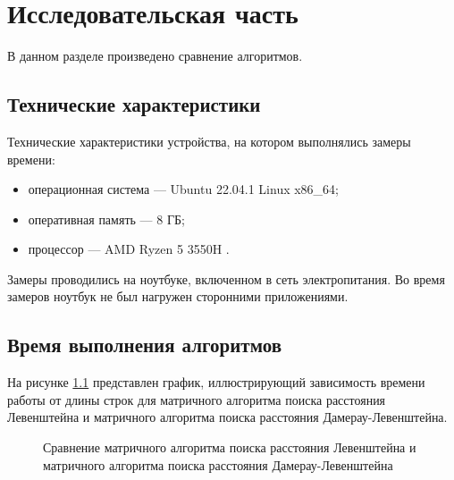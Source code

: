 \chapter{Исследовательская часть}

В данном разделе произведено сравнение алгоритмов.

\section{Технические характеристики}

Технические характеристики устройства, на котором выполнялись замеры времени:

\begin{itemize}
	\item операционная система --- Ubuntu 22.04.1 Linux x86\_64;
	\item оперативная память --- 8 ГБ;
	\item процессор --- AMD Ryzen 5 3550H \cite{amd}.
\end{itemize}

Замеры проводились на ноутбуке, включенном в сеть электропитания. Во время замеров ноутбук не был нагружен сторонними приложениями.

\section{Время выполнения алгоритмов}

На рисунке \ref{img:g1} представлен график, иллюстрирующий зависимость времени работы от длины строк для матричного алгоритма поиска расстояния Левенштейна и матричного алгоритма поиска расстояния Дамерау-Левенштейна.

\begin{figure}[h!]
	\centering
	\caption{Сравнение матричного алгоритма поиска расстояния Левенштейна и матричного алгоритма поиска расстояния Дамерау-Левенштейна}
	\label{img:g1}
\end{figure}

